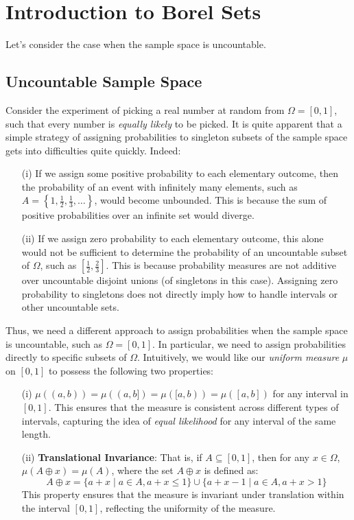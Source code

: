 \section{Introduction to Borel Sets}

Let's consider the case when the sample space is uncountable. 


\subsection{Uncountable Sample Space}

Consider the experiment of picking a real number at random from $\Omega = [0, 1]$, such that every number is \textit{equally likely} to be picked. It is quite apparent that a simple strategy of assigning probabilities to singleton subsets of the sample space gets into difficulties quite quickly. Indeed:

\begin{enumerate}
    \item[(i)] If we assign some positive probability to each elementary outcome, then the probability of an event with infinitely many elements, such as $A = \left\{1, \frac{1}{2}, \frac{1}{3}, \ldots \right\}$, would become unbounded. This is because the sum of positive probabilities over an infinite set would diverge.

    \item[(ii)] If we assign zero probability to each elementary outcome, this alone would not be sufficient to determine the probability of an uncountable subset of $\Omega$, such as $\left[\frac{1}{2}, \frac{2}{3}\right]$. This is because probability measures are not additive over uncountable disjoint unions (of singletons in this case). Assigning zero probability to singletons does not directly imply how to handle intervals or other uncountable sets.
\end{enumerate}

Thus, we need a different approach to assign probabilities when the sample space is uncountable, such as $\Omega = [0, 1]$. In particular, we need to assign probabilities directly to specific subsets of $\Omega$. Intuitively, we would like our \textit{uniform measure} $\mu$ on $[0, 1]$ to possess the following two properties:

\begin{enumerate}
    \item[(i)] $\mu((a, b)) = \mu((a, b]) = \mu([a, b)) = \mu([a, b])$ for any interval in $[0, 1]$. This ensures that the measure is consistent across different types of intervals, capturing the idea of \textit{equal likelihood} for any interval of the same length.
    
    \item[(ii)] \textbf{Translational Invariance}: That is, if $A \subseteq [0, 1]$, then for any $x \in \Omega$, $\mu(A \oplus x) = \mu(A)$, where the set $A \oplus x$ is defined as:
    \[
    A \oplus x = \{a + x \mid a \in A, a + x \leq 1\} \cup \{a + x - 1 \mid a \in A, a + x > 1\}
    \]
    This property ensures that the measure is invariant under translation within the interval $[0, 1]$, reflecting the uniformity of the measure.
\end{enumerate}

